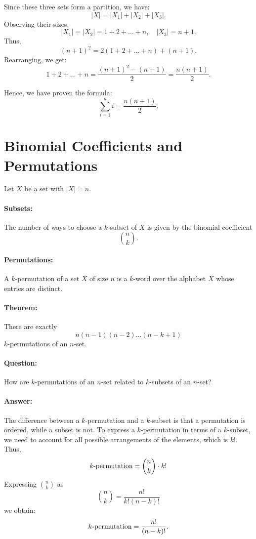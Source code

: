 Since these three sets form a partition, we have:  
\[
|X| = |X_1| + |X_2| + |X_3|.
\]  
Observing their sizes:  
\[
|X_1| = |X_2| = 1 + 2 + \dots + n, \quad |X_3| = n+1.
\]  
Thus,  
\[
(n+1)^2 = 2(1 + 2 + \dots + n) + (n+1).
\]  
Rearranging, we get:  
\[
1 + 2 + \dots + n = \frac{(n+1)^2 - (n+1)}{2} = \frac{n(n+1)}{2}.
\]

Hence, we have proven the formula:  
\[
\sum_{i=1}^{n} i = \frac{n(n+1)}{2}.
\]


\section{Binomial Coefficients and Permutations}
Let $X$ be a set with $|X| = n$.

\paragraph{Subsets:}  
The number of ways to choose a $k$-subset of $X$ is given by the binomial coefficient
\[
\binom{n}{k}.
\]

\paragraph{Permutations:}  
A \( k \)-permutation of a set \( X \) of size \( n \) is a \( k \)-word over the alphabet \( X \) whose entries are distinct.  

\paragraph{Theorem:}  
There are exactly  
\[
n (n-1) (n-2) \dots (n-k+1)
\]  
\( k \)-permutations of an \( n \)-set.  

\paragraph{Question:}  
How are \( k \)-permutations of an \( n \)-set related to \( k \)-subsets of an \( n \)-set?  

\paragraph{Answer:}  
The difference between a \( k \)-permutation and a \( k \)-subset is that a permutation is ordered, while a subset is not.  
To express a \( k \)-permutation in terms of a \( k \)-subset, we need to account for all possible arrangements of the elements, which is \( k! \).  
Thus,  
\[
\text{\( k \)-permutation} = \binom{n}{k} \cdot k!
\]
Expressing \( \binom{n}{k} \) as  
\[
\binom{n}{k} = \frac{n!}{k!(n-k)!}
\]  
we obtain:  
\[
\text{\( k \)-permutation} = \frac{n!}{(n-k)!}.
\]


